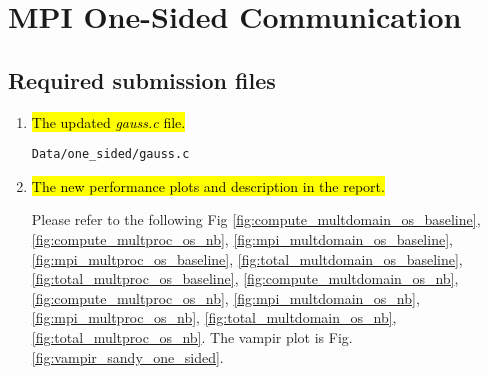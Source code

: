\section{MPI One-Sided Communication}
\subsection{Required submission files}
\begin{enumerate}
  \item \hl{The updated \emph{gauss.c} file.}

    \verb!Data/one_sided/gauss.c!

  \item \hl{The new performance plots and description in the report.}

	Please refer to the following Fig \ref{fig:compute_multdomain_os_baseline}, \ref{fig:compute_multproc_os_nb}, \ref{fig:mpi_multdomain_os_baseline}, \ref{fig:mpi_multproc_os_baseline}, \ref{fig:total_multdomain_os_baseline}, \ref{fig:total_multproc_os_baseline}, \ref{fig:compute_multdomain_os_nb}, \ref{fig:compute_multproc_os_nb}, \ref{fig:mpi_multdomain_os_nb}, \ref{fig:mpi_multproc_os_nb}, \ref{fig:total_multdomain_os_nb}, \ref{fig:total_multproc_os_nb}. The vampir plot is Fig. \ref{fig:vampir_sandy_one_sided}.

\end{enumerate}

